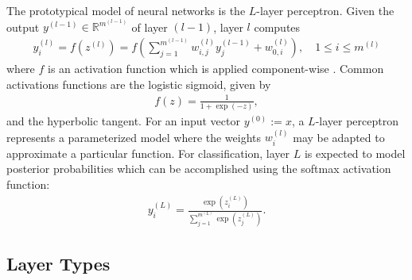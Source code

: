 The prototypical model of neural networks is the $L$-layer perceptron. Given the output $y^{(l - 1)} \in \mathbb{R}^{m^{(l - 1)}}$ of layer $(l - 1)$, layer $l$ computes
\begin{align}
    y^{(l)}_i = f(z^{(l)}) = f\left(\sum_{j = 1}^{m^{(l - 1)}} w_{i,j}^{(l)} y_j^{(l - 1)} + w_{0,i}^{(l)}\right),\quad 1 \leq i \leq m^{(l)}\label{eq:neural-network}
\end{align}
where $f$ is an activation function which is applied component-wise \cite{Bishop:1995}. Common activations functions are the logistic sigmoid, given by
\begin{align}
	f(z) = \frac{1}{1 + \exp(-z)},
\end{align}
and the hyperbolic tangent. For an input vector $y^{(0)} := x$, a $L$-layer perceptron represents a parameterized model where the weights $w_i^{(l)}$ may be adapted to approximate a particular function. For classification, layer $L$ is expected to model posterior probabilities which can be accomplished using 
the softmax activation function:
\begin{align}
    y_i^{(L)} = \frac{\exp\left(z_i^{(L)}\right)}{\sum_{j = 1}^{m^{(L)}} \exp\left(z_j^{(L)}\right)}.
\end{align}

\subsection{Layer Types}

